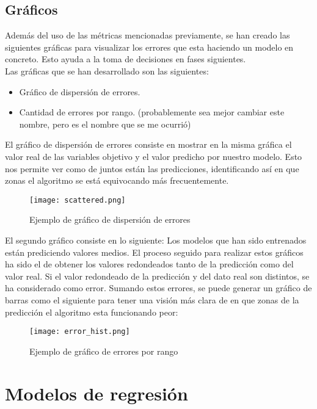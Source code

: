 \subsection{Gráficos}
Además del uso de las métricas mencionadas previamente, se han creado las siguientes gráficas para visualizar los errores que esta haciendo un modelo en concreto. Esto ayuda a la toma de decisiones en fases siguientes.\\
Las gráficas que se han desarrollado son las siguientes:
\begin{itemize}
	\item Gráfico de dispersión de errores.
	\item Cantidad de errores por rango. (probablemente sea mejor cambiar este nombre, pero es el nombre que se me ocurrió)
\end{itemize}
El gráfico de dispersión de errores consiste en mostrar en la misma gráfica el valor real de las variables objetivo y el valor predicho por nuestro modelo. Esto nos permite ver como de juntos están las predicciones, identificando así en que zonas el algoritmo se está equivocando más frecuentemente.\\
\begin{figure}[H]
	\centering
	\texttt{[image: scattered.png]}
	\caption{Ejemplo de gráfico de dispersión de errores}
	\label{fig:scattered_example}
\end{figure}

El segundo gráfico consiste en lo siguiente:
Los modelos que han sido entrenados están prediciendo valores medios. El proceso seguido para realizar estos gráficos ha sido el de obtener los valores redondeados tanto de la predicción como del valor real. Si el valor redondeado de la predicción y del dato real son distintos, se ha considerado como error.  Sumando estos errores, se puede generar un gráfico de barras como el siguiente para tener una visión más clara de en que zonas de la predicción el algoritmo esta funcionando peor:
\linebreak
\begin{figure}[H]
	\centering
	\texttt{[image: error\_hist.png]}
	\caption{Ejemplo de gráfico de errores por rango}
	\label{fig:error_hist_example}
\end{figure}
\section{Modelos de regresión}
